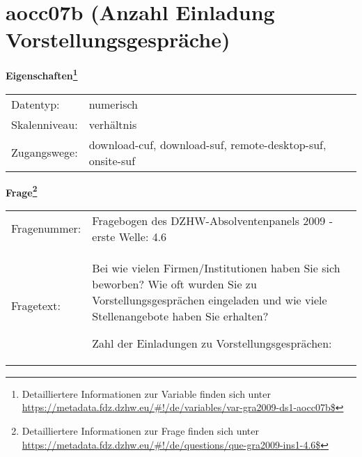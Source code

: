 
    \setcounter{footnote}{0}

    \vspace*{-1.8cm}
	\section{aocc07b (Anzahl Einladung Vorstellungsgespräche)}
	\label{section:aocc07b}



    \vspace*{0.5cm}
    \noindent\textbf{Eigenschaften\footnote{Detailliertere Informationen zur Variable finden sich unter
		\url{https://metadata.fdz.dzhw.eu/\#!/de/variables/var-gra2009-ds1-aocc07b$}}}\\
	\begin{tabularx}{\hsize}{@{}lX}
	Datentyp: & numerisch \\
	Skalenniveau: & verhältnis \\
	Zugangswege: &
	  download-cuf, 
	  download-suf, 
	  remote-desktop-suf, 
	  onsite-suf
 \\
    \end{tabularx}



				\vspace*{0.5cm}
                \noindent\textbf{Frage\footnote{Detailliertere Informationen zur Frage finden sich unter
		              \url{https://metadata.fdz.dzhw.eu/\#!/de/questions/que-gra2009-ins1-4.6$}}}\\
				\begin{tabularx}{\hsize}{@{}lX}
					Fragenummer: &
					  Fragebogen des DZHW-Absolventenpanels 2009 - erste Welle:
					  4.6
 \\
					Fragetext: & Bei wie vielen Firmen/Institutionen haben Sie sich beworben? Wie oft wurden Sie zu Vorstellungsgesprächen eingeladen und wie viele Stellenangebote haben Sie erhalten?\par  Zahl der Einladungen zu Vorstellungsgesprächen: \\
				\end{tabularx}






